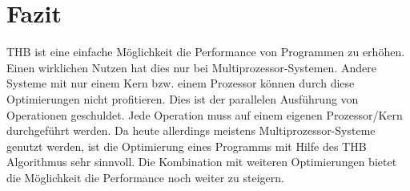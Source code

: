 \chapter{Fazit}
\ac{THB} ist eine einfache Möglichkeit die Performance von Programmen zu erhöhen. Einen wirklichen Nutzen hat dies nur bei Multiprozessor-Systemen. Andere Systeme mit nur einem Kern bzw. einem Prozessor können durch diese Optimierungen nicht profitieren. Dies ist der parallelen Ausführung von Operationen geschuldet. Jede Operation muss auf einem eigenen Prozessor/Kern durchgeführt werden. Da heute allerdings meistens Multiprozessor-Systeme genutzt werden, ist die Optimierung eines Programms mit Hilfe des \ac{THB} Algorithmus sehr sinnvoll. Die Kombination mit weiteren Optimierungen bietet die Möglichkeit die Performance noch weiter zu steigern.